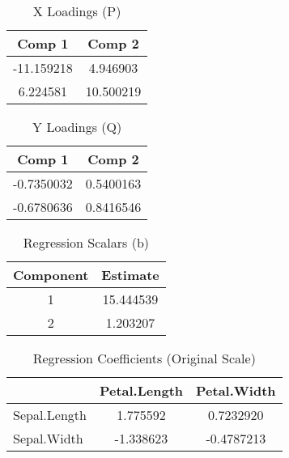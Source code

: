 \documentclass[
]{article}
\begin{document}
\begin{minipage}[t]{0.48\linewidth}
\begin{table}[H]
\centering
\caption{\label{tab:unnamed-chunk-8}X Loadings (P)}
\centering
\begin{tabular}[t]{|>{}c>{}c|}
\toprule
Comp 1 & Comp 2\\
\midrule
-11.159218 & 4.946903\\
6.224581 & 10.500219\\
\bottomrule
\end{tabular}
\end{table}
\end{minipage}\begin{minipage}[t]{0.48\linewidth}
\begin{table}[H]
\centering
\caption{\label{tab:unnamed-chunk-8}Y Loadings (Q)}
\centering
\begin{tabular}[t]{|>{}c>{}c|}
\toprule
Comp 1 & Comp 2\\
\midrule
-0.7350032 & 0.5400163\\
-0.6780636 & 0.8416546\\
\bottomrule
\end{tabular}
\end{table}
\end{minipage}

\begin{table}[H]
\centering
\caption{\label{tab:unnamed-chunk-8}Regression Scalars (b)}
\centering
\begin{tabular}[t]{|>{}c>{}c|}
\toprule
Component & Estimate\\
\midrule
1 & 15.444539\\
2 & 1.203207\\
\bottomrule
\end{tabular}
\end{table}

\begin{table}[H]
\centering
\caption{\label{tab:unnamed-chunk-8}Regression Coefficients (Original Scale)}
\centering
\begin{tabular}[t]{|>{}lc>{}c|}
\toprule
  & Petal.Length & Petal.Width\\
\midrule
Sepal.Length & 1.775592 & 0.7232920\\
Sepal.Width & -1.338623 & -0.4787213\\
\bottomrule
\end{tabular}
\end{table}

\begin{table}[H]
\centering
\caption{\label{tab:unnamed-chunk-8}Variance Explained by Components (X)}
\centering
{}
\end{table}
\end{document}
